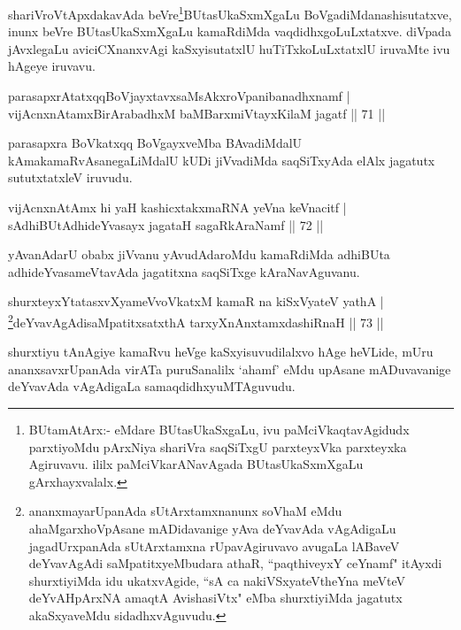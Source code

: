 \begin{artha}
shariVroVtApxdakavAda beVre\footnote{BUtamAtArx:- eMdare BUtasUkaSxgaLu, ivu paMciVkaqtavAgidudx parxtiyoMdu pArxNiya shariVra saqSiTxgU parxteyxVka parxteyxka Agiruvavu. ililx  paMciVkarANavAgada BUtasUkaSxmXgaLu gArxhayxvalalx.}BUtasUkaSxmXgaLu BoVgadiMda\break nashisutatxve, inunx beVre BUtasUkaSxmXgaLu kamaRdiMda vaqdidhxgoLuLxtatxve. diVpada jAvxlegaLu aviciCXnanxvAgi kaSxyisutatxlU huTiTxkoLuLxtatxlU iruvaMte ivu hAgeye iruvavu.
\end{artha}

\begin{shl}
parasapxrAtatxqqBoVjayxtavxsaMsAkxroVpanibanadhxnamf |\\
vijAcnxnAtamxBirArabadhxM baMBarxmiVtayxKilaM jagatf \hfill || 71 ||
\end{shl}

\begin{artha}
parasapxra BoVkatxqq BoVgayxveMba BAvadiMdalU kAmakamaRvAsanegaLiMdalU kUDi jiVvadiMda saqSiTxyAda elAlx jagatutx sututxtatxleV iruvudu.
\end{artha}


\begin{shl}
vijAcnxnAtAmx hi yaH kashicxtakxmaRNA yeVna keVnacitf |\\
sAdhiBUtAdhideYvasayx jagataH sagaRkAraNamf \hfill || 72 ||
\end{shl}

\begin{artha}
yAvanAdarU obabx jiVvanu yAvudAdaroMdu kamaRdiMda adhiBUta adhideYvasameVtavAda jagatitxna saqSiTxge kAraNavAguvanu.
\end{artha}
 
\begin{shl}
shurxteyxYtatasxvXyameVvoVkatxM kamaR na kiSxVyateV yathA |\\
\footnote{ananxmayarUpanAda sUtArxtamxnanunx soV\s haM eMdu ahaMgarxhoVpAsane mADidavanige yAva deYvavAda vAgAdigaLu jagadUrxpanAda sUtArxtamxna rUpavAgiruvavo avugaLa lABaveV deYvavAgAdi saMpatitxyeMbudara athaR, ``paqthiveyxY ceYnamf" itAyxdi shurxtiyiMda idu ukatxvAgide, ``sA ca nakiVSxyateV\s theYna meVteV deYvAHpArxNA amaqtA AvishasiVtx" eMba shurxtiyiMda jagatutx akaSxyaveMdu sidadhxvAguvudu.}deYvavAgAdisaMpatitxsatxthA tarxyXnAnxtamxdashiRnaH \hfill || 73 ||
\end{shl}

\begin{artha}
shurxtiyu tAnAgiye kamaRvu heVge kaSxyisuvudilalxvo hAge heVLide, mUru ananxsavxrUpanAda virATa puruSanalilx `ahamf' eMdu upAsane mADuvavanige deYvavAda vAgAdigaLa samaqdidhxyuMTAguvudu.
\end{artha}

